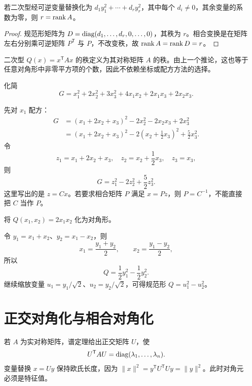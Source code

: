 \begin{corollary}[秩与非零平方项个数]
若二次型经可逆变量替换化为 $d_1y_1^2+\cdots+d_ry_r^2$，其中每个 $d_i\ne0$，其余变量的系数为零，则 $r=\operatorname{rank} A$。
\end{corollary}
\begin{proof}
规范形矩阵为 $D=\operatorname{diag}(d_1,\ldots,d_r,0,\ldots,0)$，其秩为 $r$。相合变换是在矩阵左右分别乘可逆矩阵 $P^{\mathsf T}$ 与 $P$，不改变秩，故 $\operatorname{rank} A=\operatorname{rank} D=r$。
\end{proof}

\begin{definition}[二次型的秩]
二次型 $Q(x)=x^{\mathsf T}Ax$ 的秩定义为其对称矩阵 $A$ 的秩。由上一个推论，这也等于任意对角形中非零平方项的个数，因此不依赖坐标或配方方法的选择。
\end{definition}

\begin{example}[title={三元二次型的逐步配方}]
化简
\[
G=x_1^2+2x_2^2+3x_3^2+4x_1x_2+2x_1x_3+2x_2x_3.
\]
\begin{solution}
先对 $x_1$ 配方：
\begin{align*}
G&=(x_1+2x_2+x_3)^2-2x_2^2-2x_2x_3+2x_3^2\\
&=(x_1+2x_2+x_3)^2-2\left(x_2+\frac12x_3\right)^2+\frac52x_3^2.
\end{align*}
令
\[
z_1=x_1+2x_2+x_3,\quad z_2=x_2+\frac12x_3,\quad z_3=x_3,
\]
则
\[
G=z_1^2-2z_2^2+\frac52z_3^2.
\]
这里写出的是 $z=Cx$。若要求相合矩阵 $P$ 满足 $x=Pz$，则 $P=C^{-1}$，不能直接把 $C$ 当作 $P$。
\end{solution}
\end{example}

\begin{example}[title={没有平方项时的配方}]
将 $Q(x_1,x_2)=2x_1x_2$ 化为对角形。
\begin{solution}
令 $y_1=x_1+x_2$、$y_2=x_1-x_2$，则
\[
x_1=\frac{y_1+y_2}{2},\qquad x_2=\frac{y_1-y_2}{2},
\]
所以
\[
Q=\frac12y_1^2-\frac12y_2^2.
\]
继续缩放变量 $u_1=y_1/\sqrt2$、$u_2=y_2/\sqrt2$，可得规范形 $Q=u_1^2-u_2^2$。
\end{solution}
\end{example}

\section{正交对角化与相合对角化}

若 $A$ 为实对称矩阵，谱定理给出正交矩阵 $U$，使
\[
U^{\mathsf T}AU=\operatorname{diag}(\lambda_1,\ldots,\lambda_n).
\]
变量替换 $x=Uy$ 保持欧氏长度，因为 $\lVert x\rVert^2=y^{\mathsf T}U^{\mathsf T}Uy=\lVert y\rVert^2$。此时对角元必须是特征值。

